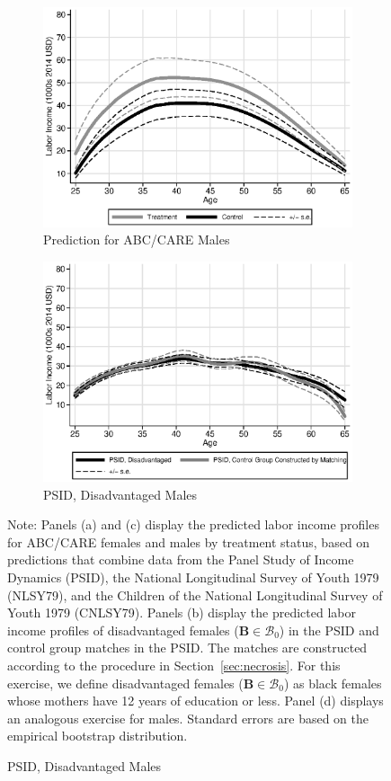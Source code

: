 \begin{figure}
\begin{subfigure}[h]{0.4\textwidth}
		\centering
		\caption{Prediction for ABC/CARE Males} \label{fig:labor-income-profilesc}
		\includegraphics[width=\textwidth]{output/labor_25-65_pset1_mset3_male.eps}
\end{subfigure}%
\begin{subfigure}[h]{0.4\textwidth}
	\centering
	\caption{PSID, Disadvantaged Males} \label{fig:labor-income-profilesd}
		\includegraphics[width=\textwidth]{output/psid_B0_match_s1.eps}
\end{subfigure}
\footnotesize \justify
Note: Panels (a) and (c) display the predicted labor income profiles for ABC/CARE females and males by treatment status, based on predictions that combine data from the Panel Study of Income Dynamics (PSID), the National Longitudinal Survey of Youth 1979 (NLSY79), and the Children of the National Longitudinal Survey of Youth 1979 (CNLSY79). Panels (b) display the predicted labor income profiles of disadvantaged females ($\bm{B} \in \mathcal{B}_0$) in the PSID and control group matches in the PSID. The matches are constructed according to the procedure in Section~\ref{sec:necrosis}. For this exercise, we define disadvantaged females ($\bm{B} \in \mathcal{B}_0$) as black females whose mothers have 12 years of education or less. Panel (d) displays an analogous exercise for males. Standard errors are based on the empirical bootstrap distribution.\\
\end{figure}

